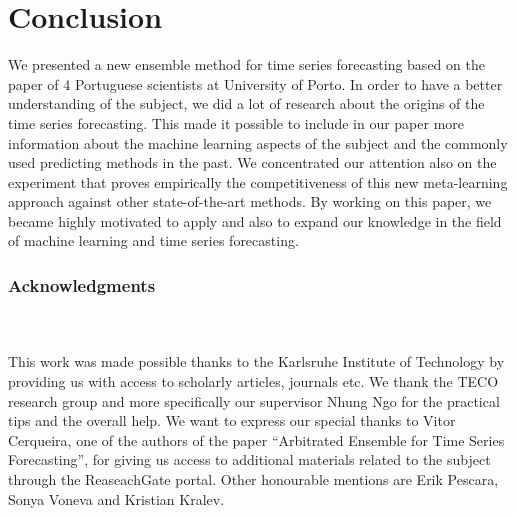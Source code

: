 \documentclass[runningheads,a4paper]{llncs}[2015/06/24]
\begin{document}
\section{Conclusion}
We presented a new ensemble method for time series forecasting based on the paper of 4 Portuguese scientists at University of Porto\cite{VtorCerqueira2017}. In order to have a better understanding of the subject, we did a lot of research about the origins of the time series forecasting. This made it possible to include in our paper more information about the machine learning aspects of the subject and the commonly used predicting methods in the past. We concentrated our attention also on the experiment that proves empirically the competitiveness of this new meta-learning approach against other state-of-the-art methods. By working on this paper, we became highly motivated to apply and also to expand our knowledge in the field of machine learning and time series forecasting.  

\subsubsection{Acknowledgments}
\hspace{1cm}\\\\This work was made possible thanks to the Karlsruhe Institute of Technology by providing us with access to scholarly articles, journals etc. We thank the TECO research group and more specifically our supervisor Nhung Ngo for the practical tips and the overall help. We want to express our special thanks to Vitor Cerqueira, one of the authors of the paper \enquote{Arbitrated Ensemble for Time Series Forecasting}, for giving us access to additional materials related to the subject through the ReaseachGate portal. Other honourable mentions are Erik Pescara, Sonya Voneva and Kristian Kralev.



\end{document}
